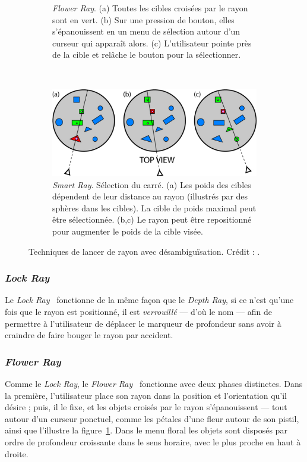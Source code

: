 \begin{figure}[htbp]
\begin{subfigure}[t]{\rayWidth}
			\caption{\emph{Flower Ray}. (a) Toutes les cibles croisées par le rayon sont en vert. (b) Sur une pression de bouton, elles s'épanouissent en un menu de sélection autour d'un curseur qui apparaît alors. (c) L'utilisateur pointe près de la cible et relâche le bouton pour la sélectionner.}
			\label{fig:flowerRay}
		\end{subfigure}
		~
		\begin{subfigure}[t]{\rayWidth}
			\centering
			\includegraphics[width=\rayImgWidth]{figures/ch2/smartRay}
			\caption{\emph{Smart Ray}. Sélection du carré. (a) Les poids des cibles dépendent de leur distance au rayon (illustrés par des sphères dans les cibles). La cible de poids maximal peut être sélectionnée. (b,c) Le rayon peut être repositionné pour augmenter le poids de la cible visée.}
			\label{fig:smartRay}
		\end{subfigure}
		\caption[Lancer de rayon avec désambiguïsation]{Techniques de lancer de rayon avec désambiguïsation. Crédit : \cite{grossman2006design}.}
		\label{fig:depthLockFlowerSmartRays}
	\end{figure}
	
	\subsubsection{\emph{Lock Ray}}
	Le \emph{Lock Ray}~\cite{grossman2006design} fonctionne de la même façon que le \emph{Depth Ray}, si ce n'est qu'une fois que le rayon est positionné, il est \emph{verrouillé} --- d'où le nom --- afin de permettre à l'utilisateur de déplacer le marqueur de profondeur sans avoir à craindre de faire bouger le rayon par accident.
	
	\subsubsection{\emph{Flower Ray}}
	Comme le \emph{Lock Ray}, le \emph{Flower Ray}~\cite{grossman2006design} fonctionne avec deux phases distinctes. Dans la première, l'utilisateur place son rayon dans la position et l'orientation qu'il désire ; puis, il le fixe, et les objets croisés par le rayon \og s'épanouissent \fg{}  --- tout autour d'un curseur ponctuel, comme les pétales d'une fleur autour de son pistil, ainsi que l'illustre la figure~\ref{fig:flowerRay}. Dans le menu \og floral \fg{} les objets sont disposés par ordre de profondeur croissante dans le sens horaire, avec le plus proche en haut à droite.
		
